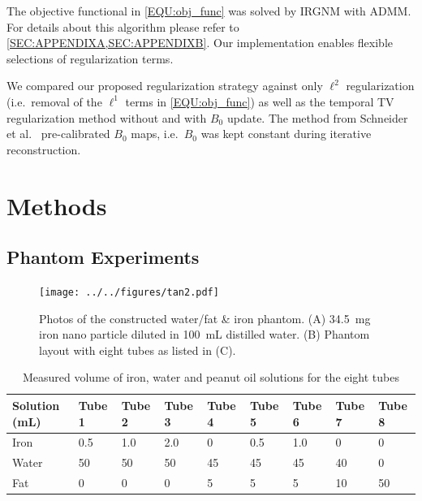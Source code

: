 \documentclass[journal,twoside,web]{ieeecolor}
\begin{document}
The objective functional in \cref{EQU:obj_func} was solved by IRGNM with ADMM. 
For details about this algorithm please refer to 
\cref{SEC:APPENDIXA,SEC:APPENDIXB}. 
Our implementation enables flexible selections of regularization terms. 

We compared our proposed regularization strategy against only $\ell^2$ regularization 
(i.e.~removal of the $\ell^1$ terms in \cref{EQU:obj_func}) 
as well as the temporal TV regularization method 
without and with $B_0$ update. 
The method from Schneider et al.~\cite{schneider_2020_mobawfr2s} pre-calibrated $B_0$ maps, 
i.e.~$B_0$ was kept constant during iterative reconstruction.

\section{Methods}

\subsection{Phantom Experiments}

\begin{figure}
	\centering
	\texttt{[image: ../../figures/tan2.pdf]}
	\caption{Photos of the constructed water/fat \& iron phantom. 
			(A) 34.5~mg iron nano particle diluted in 100~mL distilled water.
			(B) Phantom layout with eight tubes as listed in (C).}
	\label{FIG:PHA_WFIRON}
\end{figure}

\begin{table}[t]
	\caption{Measured volume of iron, water and peanut oil solutions for the eight tubes}
	\setlength{\tabcolsep}{3pt}
	\begin{tabular}{m{} m{} m{} m{} m{} m{} m{} m{} m{}}
			\toprule
			Solution (\si{\milli\liter}) & Tube 1 & Tube 2 & Tube 3 & Tube 4 & Tube 5 & Tube 6 & Tube 7 & Tube 8 \\
			\hline
			Iron  &  0.5 &  1.0 &  2.0 &  0 &  0.5 &  1.0 &  0 &  0 \\
			Water & 50   & 50   & 50   & 45 & 45   & 45   & 40 &  0 \\
			Fat   &  0   &  0   &  0   &  5 &  5   &  5   & 10 & 50 \\
			\bottomrule
		\end{tabular}
	\label{TAB:PHA}
\end{table}
\end{document}
